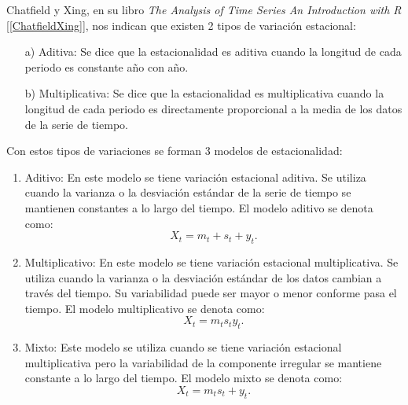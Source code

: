 Chatfield y Xing, en su libro \textit{The Analysis of Time Series An Introduction with R} [\ref{ChatfieldXing}], nos indican que existen 2 tipos de variación estacional:
  
  \begin{itemize}
\item[a)] Aditiva: Se dice que la estacionalidad es aditiva cuando la longitud de cada periodo es constante año con año.

\item[b)] Multiplicativa: Se dice que la estacionalidad es multiplicativa cuando la longitud de cada periodo es directamente proporcional a la media de los datos de la serie de tiempo.
\end{itemize}

Con estos tipos de variaciones se forman 3 modelos de estacionalidad:


  \begin{enumerate}
\item Aditivo: En este modelo se tiene variación estacional aditiva. Se utiliza cuando la varianza o la desviación estándar de la serie de tiempo se mantienen constantes a lo largo del tiempo. El modelo aditivo se denota como:
\begin{equation}
X_{t} = m_{t} + s_{t} + y_{t}.
\end{equation}

\item Multiplicativo: En este modelo se tiene variación estacional multiplicativa. Se utiliza cuando la varianza o la desviación estándar de los datos cambian a través del tiempo. Su variabilidad puede ser mayor o menor conforme pasa el tiempo. El modelo multiplicativo se denota como:
\begin{equation}
X_{t} = m_{t}s_{t}y_{t}.
\end{equation}

\item Mixto: Este modelo se utiliza cuando se tiene variación estacional multiplicativa pero la variabilidad de la componente irregular se mantiene constante a lo largo del tiempo. El modelo mixto se denota como:
\begin{equation}
X_{t} = m_{t}s_{t} + y_{t}.
\end{equation}
\end{enumerate}

